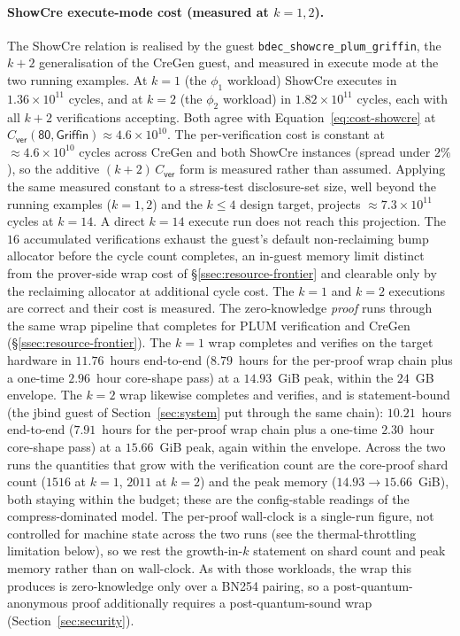 \paragraph{ShowCre execute-mode cost (measured at $k=1,2$).}
The ShowCre relation is realised by the guest \texttt{bdec\_showcre\_plum\_griffin}, the $k+2$ generalisation of the CreGen guest, and measured in execute mode at the two running examples. At $k=1$ (the $\phi_1$ workload) ShowCre executes in $1.36\times10^{11}$ cycles, and at $k=2$ (the $\phi_2$ workload) in $1.82\times10^{11}$ cycles, each with all $k+2$ verifications accepting. Both agree with Equation~\eqref{eq:cost-showcre} at $C_{\mathsf{ver}}(\textsf{80},\textsf{Griffin})\approx 4.6\times10^{10}$. The per-verification cost is constant at $\approx 4.6\times10^{10}$ cycles across CreGen and both ShowCre instances (spread under $2\%$), so the additive $(k+2)\,C_{\mathsf{ver}}$ form is measured rather than assumed. Applying the same measured constant to a stress-test disclosure-set size, well beyond the running examples ($k=1,2$) and the $k\le 4$ design target, projects $\approx 7.3\times10^{11}$ cycles at $k=14$. A direct $k=14$ execute run does not reach this projection. The $16$ accumulated verifications exhaust the guest's default non-reclaiming bump allocator before the cycle count completes, an in-guest memory limit distinct from the prover-side wrap cost of \S\ref{ssec:resource-frontier} and clearable only by the reclaiming allocator at additional cycle cost. The $k=1$ and $k=2$ executions are correct and their cost is measured. The zero-knowledge \emph{proof} runs through the same wrap pipeline that completes for PLUM verification and CreGen (\S\ref{ssec:resource-frontier}). The $k=1$ wrap completes and verifies on the target hardware in $11.76$~hours end-to-end ($8.79$~hours for the per-proof wrap chain plus a one-time $2.96$~hour core-shape pass) at a $14.93$~GiB peak, within the $24$~GB envelope. The $k=2$ wrap likewise completes and verifies, and is statement-bound (the jbind guest of Section~\ref{sec:system} put through the same chain): $10.21$~hours end-to-end ($7.91$~hours for the per-proof wrap chain plus a one-time $2.30$~hour core-shape pass) at a $15.66$~GiB peak, again within the envelope. Across the two runs the quantities that grow with the verification count are the core-proof shard count ($1516$ at $k=1$, $2011$ at $k=2$) and the peak memory ($14.93\rightarrow15.66$~GiB), both staying within the budget; these are the config-stable readings of the compress-dominated model. The per-proof wall-clock is a single-run figure, not controlled for machine state across the two runs (see the thermal-throttling limitation below), so we rest the growth-in-$k$ statement on shard count and peak memory rather than on wall-clock. As with those workloads, the wrap this produces is zero-knowledge only over a {BN254} pairing, so a post-quantum-anonymous proof additionally requires a post-quantum-sound wrap (Section~\ref{sec:security}).

